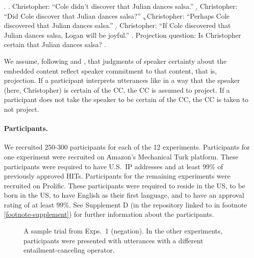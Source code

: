 \documentclass[a4paper,12pt,twoside]{article}
\begin{document}
	\ex. \label{ex:certain-that}
		\a. Christopher: ``Cole didn't discover that Julian dances salsa.''
		\b. Christopher: ``Did Cole discover that Julian dances salsa?''
		\c. Christopher: ``Perhaps Cole discovered that Julian dances salsa.''
		\d. Christopher: ``If Cole discovered that Julian dances salsa, Logan will be joyful.''
		\z.
		Projection question: Is Christopher certain that Julian dances salsa?
	\z.

    We assume, following \citealt{tonhauser_how_2018} and \citealt{degen_are_2022}, that judgments of speaker certainty about the embedded content reflect speaker commitment to that content, that is, projection. If a participant interprets utterances like \Last[a--d] in a way that the speaker (here, Christopher) is certain of the CC, the CC is assumed to project. If a participant does not take the speaker to be certain of the CC, the CC is taken to not project.

    \paragraph{Participants.}
	    We recruited 250-300 participants for each of the 12 experiments. Participants for one experiment were recruited on Amazon's Mechanical Turk platform. These participants were required to have U.S.\ IP addresses and at least 99\% of previously approved HITs. Participants for the remaining experiments were recruited on Prolific. These participants were required to reside in the US, to be born in the US, to have English as their first language, and to have an approval rating of at least 99\%. See Supplement D (in the repository linked to in footnote \ref{footnote-supplement}) for further information about the participants. 
			

            \begin{figure}[h!]
				\centering
				\caption{A sample trial from Exps.~1 (negation). In the other experiments, participants were presented with utterances with a different entailment-canceling operator.}
				\label{fig:trial}
			\end{figure}
   
\end{document}
